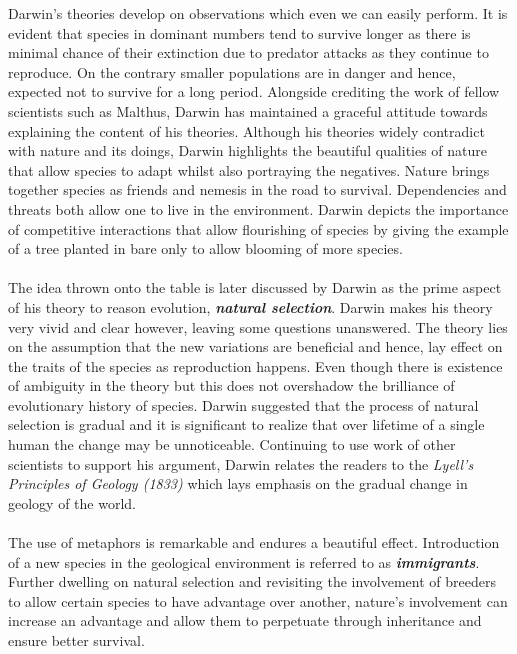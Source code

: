 \documentclass{article}
\begin{document}
	Darwin's theories develop on observations which even we can easily perform. It is evident that species in dominant numbers tend to survive longer as there is minimal chance of their extinction due to predator attacks as they continue to reproduce. On the contrary smaller populations are in danger and hence, expected not to survive for a long period. Alongside crediting the work of fellow scientists such as Malthus, Darwin has maintained a graceful attitude towards explaining the content of his theories. Although his theories widely contradict with nature and its doings, Darwin highlights the beautiful qualities of nature that allow species to adapt whilst also portraying the negatives. Nature brings together species as friends and nemesis in the road to survival. Dependencies and threats both allow one to live in the environment. Darwin depicts the importance of competitive interactions that allow flourishing of species by giving the example of a tree planted in bare only to allow blooming of more species. \\ \\
	The idea thrown onto the table is later discussed by Darwin as the prime aspect of his theory to reason evolution, \textbf{\textit{natural selection}}.  Darwin makes his theory very vivid and clear however, leaving some questions unanswered. The theory lies on the assumption that the new variations are beneficial and hence, lay effect on the traits of the species as reproduction happens. Even though there is existence of ambiguity in the theory but this does not overshadow the brilliance of evolutionary history of species. Darwin suggested that the process of natural selection is gradual and it is significant to realize that over lifetime of a single human the change may be unnoticeable. Continuing to use work of other scientists to support his argument, Darwin relates the readers to the \textit{Lyell's Principles of Geology (1833)} which lays emphasis on the gradual change in geology of the world. \\ \\
	The use of metaphors is remarkable and endures a beautiful effect. Introduction of a new species in the geological environment is referred to as \textbf{\textit{immigrants}}. Further dwelling on natural selection and revisiting the involvement of breeders to allow certain species to have advantage over another, nature's involvement can increase an advantage and allow them to perpetuate through inheritance and ensure better survival. \\ \\
\end{document}
